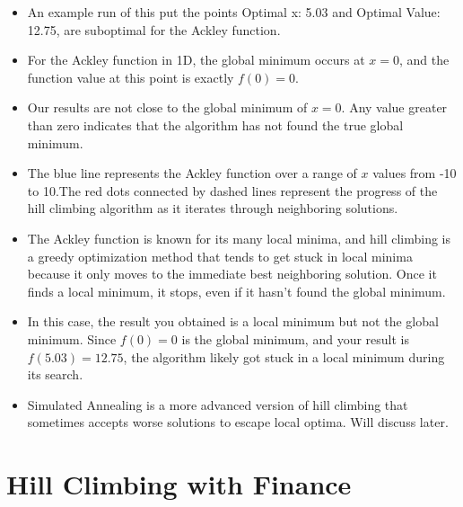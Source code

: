 \documentclass[
  letterpaper,
  DIV=11,
  numbers=noendperiod]{scrreprt}
\providecommand{\tightlist}{%
  \setlength{\itemsep}{0pt}\setlength{\parskip}{0pt}}\usepackage{longtable,booktabs,array}
\begin{document}
\begin{itemize}
\tightlist
\item
  An example run of this put the points Optimal x: 5.03 and Optimal
  Value: 12.75, are suboptimal for the Ackley function.
\item
  For the Ackley function in 1D, the global minimum occurs at \(x=0\),
  and the function value at this point is exactly \(f(0)=0\).
\item
  Our results are not close to the global minimum of \(x=0\). Any value
  greater than zero indicates that the algorithm has not found the true
  global minimum.
\item
  The blue line represents the Ackley function over a range of \(x\)
  values from -10 to 10.The red dots connected by dashed lines represent
  the progress of the hill climbing algorithm as it iterates through
  neighboring solutions.
\item
  The Ackley function is known for its many local minima, and hill
  climbing is a greedy optimization method that tends to get stuck in
  local minima because it only moves to the immediate best neighboring
  solution. Once it finds a local minimum, it stops, even if it hasn't
  found the global minimum.
\item
  In this case, the result you obtained is a local minimum but not the
  global minimum. Since \(f(0)=0\) is the global minimum, and your
  result is \(f(5.03)= 12.75\), the algorithm likely got stuck in a
  local minimum during its search.
\item
  Simulated Annealing is a more advanced version of hill climbing that
  sometimes accepts worse solutions to escape local optima. Will discuss
  later.
\end{itemize}


\chapter{Hill Climbing with Finance}\label{hill-climbing-with-finance}
\end{document}
